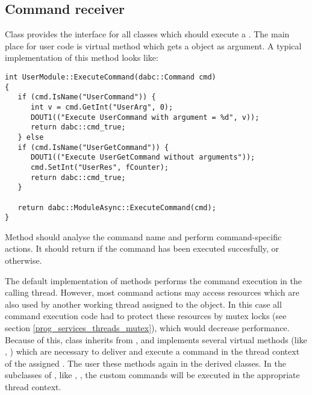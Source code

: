 \subsection{Command receiver}

Class  provides the interface for all classes
which should execute a .
The main place for user code is virtual method  
which gets a  
object as argument. 
A typical implementation of this method looks like:

\begin{small}
\begin{verbatim}
int UserModule::ExecuteCommand(dabc::Command cmd)
{
   if (cmd.IsName("UserCommand")) {
      int v = cmd.GetInt("UserArg", 0);
      DOUT1(("Execute UserCommand with argument = %d", v));
      return dabc::cmd_true;
   } else
   if (cmd.IsName("UserGetCommand")) {
      DOUT1(("Execute UserGetCommand without arguments"));
      cmd.SetInt("UserRes", fCounter);
      return dabc::cmd_true;
   } 
      
   return dabc::ModuleAsync::ExecuteCommand(cmd);
}
\end{verbatim}     
\end{small}
 
Method  should analyse the command name and perform command-specific
actions. It should return  if the command has been executed 
succesfully, or  otherwise.  

The default implementation of  methods performs 
the command execution in the calling thread.
However, most command actions may access resources which are also
used by another working thread assigned to the  object.
In this case all command execution code had to protect these resources
by mutex locks (see section \ref{prog_services_threads_mutex}), which
would decrease performance. Because of this, class
 inherits from ,
and implements several virtual methods (like , ) 
which are necessary to deliver and execute a command in the thread context of the
assigned .
The user  these methods again in the derived classes.
In the \dabc~ subclasses of , like , , the custom commands will be executed 
in the appropriate thread context.  

